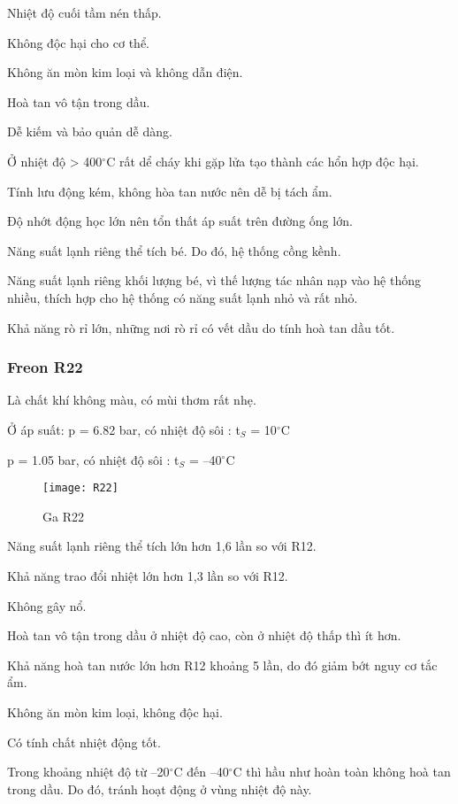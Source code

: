 Nhiệt độ cuối tầm nén thấp.

Không độc hại cho cơ thể.

Không ăn mòn kim loại và không dẫn điện.

Hoà tan vô tận trong dầu.

Dễ kiếm và bảo quản dễ dàng.

Ở nhiệt độ > 400$^{\circ}$C rất dể cháy khi gặp lửa tạo thành các hổn hợp độc hại.

Tính lưu động kém, không hòa tan nước nên dễ bị tách ẩm.

Độ nhớt động học lớn nên tổn thất áp suất trên đường ống lớn.

Năng suất lạnh riêng thể tích bé. Do đó, hệ thống cồng kềnh.

Năng suất lạnh riêng khối lượng bé, vì thế lượng tác nhân nạp vào hệ thống nhiều, thích hợp cho hệ thống có năng suất lạnh nhỏ và rất nhỏ.

Khả năng rò rỉ lớn, những nơi rò rỉ có vết dầu do tính hoà tan dầu tốt.

\subsubsection{Freon R22}
Là chất khí không màu, có mùi thơm rất nhẹ.

Ở áp suất: 
\hspace{1cm}
p = 6.82 bar, có nhiệt độ sôi : t$_{S}$ = 10$^{\circ}$C

\hspace{2.95cm}
p = 1.05 bar, có nhiệt độ sôi : t$_{S}$ = –40$^{\circ}$C
\begin{figure}[H]
	\centering
	\texttt{[image: R22]}
	\caption{Ga R22}
\end{figure}

Năng suất lạnh riêng thể tích lớn hơn 1,6 lần so với R12.

Khả năng trao đổi nhiệt lớn hơn 1,3 lần so với R12.

Không gây nổ.

Hoà tan vô tận trong dầu ở nhiệt độ cao, còn ở nhiệt độ thấp thì ít hơn.

Khả năng hoà tan nước lớn hơn R12 khoảng 5 lần, do đó giảm bớt nguy cơ tắc ẩm.

Không ăn mòn kim loại, không độc hại.

Có tính chất nhiệt động tốt.

Trong khoảng nhiệt độ từ –20$^{\circ}$C đến –40$^{\circ}$C thì hầu như hoàn toàn không hoà tan trong dầu. Do đó, tránh hoạt động ở vùng nhiệt độ này.

